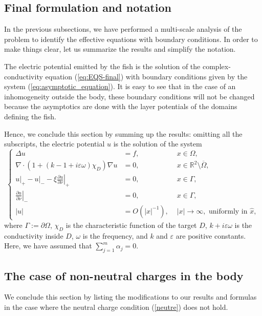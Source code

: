 \documentclass[final]{siamltex}
\numberwithin{equation}{section}
\numberwithin{figure}{section}
\numberwithin{table}{section}
\begin{document}
\subsection{Final formulation and notation}

In the previous subsections, we have performed a multi-scale
analysis of the problem to identify the effective equations with
boundary conditions. In order to make things clear, let us
summarize the results and simplify the notation.

The electric potential emitted by the fish is the solution of the
complex-conductivity equation (\ref{eq:EQS-final}) with boundary
conditions given by the system (\ref{eq:asymptotic_equation}). It
is easy to see that in the case of an inhomogeneity outside the
body, these boundary conditions will not be changed because the
asymptotics are done with the layer potentials of the domains
defining the fish.

Hence, we conclude this section by summing up the results:
omitting all the subscripts, the electric potential $u$ is the
solution of the system
\begin{equation}
\left\{ \begin{alignedat}{2}\Delta u & = {f}, & \,
\, x\in \Omega,\\
\nabla\cdot (1+ (k -1 +i\varepsilon\omega) \chi_D) \nabla u & = 0,
& \,
\, x\in\mathbb{R}^{2}\setminus\overline{\Omega},\\
{} u \big|_+ - u \big|_- -\xi\left.\frac{\partial u}{\partial\nu}\right|_{+} & =0, & \,\, x\in\Gamma,\\
\left.\frac{\partial u}{\partial\nu}\right|_{-} & =0, & \,\, x\in\Gamma,\\
\left|u\right| & = {O}(\left|x\right|^{-1}), &
\,\,\left|x\right|\rightarrow\infty,\text{ uniformly in }\hat{x},
\end{alignedat}
\right.\label{eq:direct_problem-final}
\end{equation}
where $\Gamma:= \partial \Omega$,  $\chi_D$ is the characteristic
function of the target $D$, $k+ i \varepsilon \omega$ is the
conductivity inside $D$, $\omega$ is the frequency, and $k$ and
$\varepsilon$ are positive constants. Here, we have assumed that
$\sum_{j=1}^m \alpha_j=0$.
\subsection{The case of non-neutral charges in the body}

We conclude this section by listing the modifications to our
results and formulas in the case where the neutral charge
condition (\ref{neutre}) does not hold.
\end{document}

